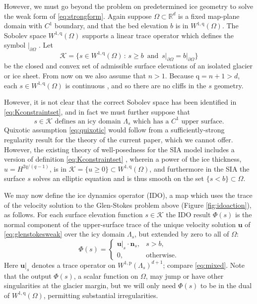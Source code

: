 \documentclass[letterpaper,final,12pt,reqno]{amsart}
\theoremstyle{claim}
\newcommand{\RR}{\mathbb{R}}
\newcommand{\bn}{\mathbf{n}}
\newcommand{\bu}{\mathbf{u}}
\newcommand{\pp}{{\text{p}}}
\newcommand{\qq}{{\text{q}}}
\numberwithin{equation}{section}
\numberwithin{figure}{section}
\numberwithin{table}{section}
\numberwithin{theorem}{section}
\begin{document}
However, we must go beyond the problem on predetermined ice geometry to solve the weak form of \eqref{eq:strongform}.  Again suppose $\Omega \subset \RR^d$ is a fixed map-plane domain with $C^1$ boundary, and that the bed elevation $b$ is in $W^{1,\qq}(\Omega)$.  The Sobolev space $W^{1,\qq}(\Omega)$ supports a linear trace operator which defines the symbol $|_{\partial \Omega}$ \cite[Section 5.5]{Evans2010}.  Let
\begin{equation}
\mathcal{K} = \{s \in W^{1,\qq}(\Omega) \,:\, s \ge b \, \text{ and } \, s\big|_{\partial\Omega} = b\big|_{\partial\Omega}\}  \label{eq:Kconstraintset}
\end{equation}
be the closed and convex set of admissible surface elevations of an isolated glacier or ice sheet.  From now on we also assume that $n>1$.  Because $\qq = n+1 > d$, each $s \in W^{1,\qq}(\Omega)$ is continuous \cite[Morrey's inequality, section 5.6.2]{Evans2010}, and so there are no cliffs in the $s$ geometry.

However, it is not clear that the correct Sobolev space has been identified in \eqref{eq:Kconstraintset}, and in fact we must further suppose that
\begin{equation}
s\in \mathcal{K} \text{ defines an icy domain } \Lambda_s \text{ which has a $C^1$ upper surface.} \label{eq:quixotic}
\end{equation}
Quixotic assumption \eqref{eq:quixotic} would follow from a sufficiently-strong regularity result for the theory of the current paper, which we cannot offer.  However, the existing theory of well-posedness for the SIA model includes a version of definition \eqref{eq:Kconstraintset} \cite{JouvetBueler2012}, wherein a power of the ice thickness, $u=H^{2q/(q-1)}$, is in $\mathcal{K} = \{u \ge 0\} \subset W^{1,\qq}(\Omega)$, and furthermore in the SIA the surface $s$ solves an elliptic equation and is thus smooth on the set $\{s<b\} \subset \Omega$.

We may now define the ice dynamics operator (IDO), a map which uses the trace of the velocity solution to the Glen-Stokes problem above (Figure \ref{fig:idoaction}), as follows.  For each surface elevation function $s \in \mathcal{K}$ the IDO result $\Phi(s)$ is the normal component of the upper-surface trace of the unique velocity solution $\bu$ of \eqref{eq:glenstokesweak} over the icy domain $\Lambda_s$, but extended by zero to all of $\Omega$:
\begin{equation}
\Phi(s) = \begin{cases} \bu|_s \cdot \bn_s, & s > b, \\
                        0, & \text{otherwise}. \end{cases} \label{eq:ido}
\end{equation}
Here $\bu|_s$ denotes a trace operator on $W^{1,\pp}(\Lambda_s)^{d+1}$; compare \eqref{eq:mixed}.  Note that the output $\Phi(s)$, a scalar function on $\Omega$, may jump or have other singularities at the glacier margin, but we will only need $\Phi(s)$ to be in the dual of $W^{1,\qq}(\Omega)$, permitting substantial irregularities.
\end{document}
